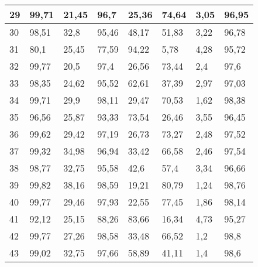 \begin{longtable}[c]{|l|l|l|l|l|l|l|l|}
29              & 99,71        & 21,45        & 96,7        & 25,36         & 74,64         & 3,05          & 96,95         \\ \hline
30              & 98,51        & 32,8         & 95,46       & 48,17         & 51,83         & 3,22          & 96,78         \\ \hline
31              & 80,1         & 25,45        & 77,59       & 94,22         & 5,78          & 4,28          & 95,72         \\ \hline
32              & 99,77        & 20,5         & 97,4        & 26,56         & 73,44         & 2,4           & 97,6          \\ \hline
33              & 98,35        & 24,62        & 95,52       & 62,61         & 37,39         & 2,97          & 97,03         \\ \hline
34              & 99,71        & 29,9         & 98,11       & 29,47         & 70,53         & 1,62          & 98,38         \\ \hline
35              & 96,56        & 25,87        & 93,33       & 73,54         & 26,46         & 3,55          & 96,45         \\ \hline
36              & 99,62        & 29,42        & 97,19       & 26,73         & 73,27         & 2,48          & 97,52         \\ \hline
37              & 99,32        & 34,98        & 96,94       & 33,42         & 66,58         & 2,46          & 97,54         \\ \hline
38              & 98,77        & 32,75        & 95,58       & 42,6          & 57,4          & 3,34          & 96,66         \\ \hline
39              & 99,82        & 38,16        & 98,59       & 19,21         & 80,79         & 1,24          & 98,76         \\ \hline
40              & 99,77        & 29,46        & 97,93       & 22,55         & 77,45         & 1,86          & 98,14         \\ \hline
41              & 92,12        & 25,15        & 88,26       & 83,66         & 16,34         & 4,73          & 95,27         \\ \hline
42              & 99,77        & 27,26        & 98,58       & 33,48         & 66,52         & 1,2           & 98,8          \\ \hline
43              & 99,02        & 32,75        & 97,66       & 58,89         & 41,11         & 1,4           & 98,6          \\ \hline

\end{longtable}
